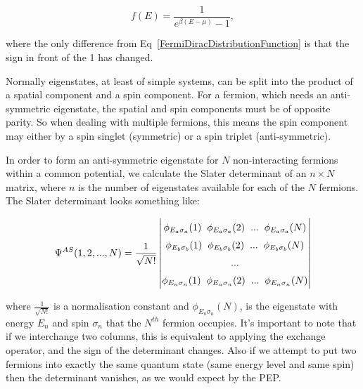 \begin{equation}
    f(E) = \frac{1}{e^{\beta (E - \mu)} - 1},
    \label{BoseEinsteinDistributionFunction}
\end{equation}

\noindent where the only difference from Eq~\ref{FermiDiracDistributionFunction} is that the sign in front of the 1 has changed.

\noindent Normally eigenstates, at least of simple systems, can be split into the product of a spatial component and a spin component. For a fermion, which needs an anti-symmetric eigenstate, the spatial and spin components must be of opposite parity. So when dealing with multiple fermions, this means the spin component may either by a spin singlet (symmetric) or a spin triplet (anti-symmetric).

\noindent In order to form an anti-symmetric eigenstate for $N$ non-interacting fermions within a common potential, we calculate the Slater determinant of an $n \times N$ matrix, where $n$ is the number of eigenstates available for each of the $N$ fermions. The Slater determinant looks something like:

\begin{equation}
    \renewcommand*{\arraystretch}{1.5}
    \setlength\arraycolsep{20pt}
    \Psi^{AS} (1, 2, ..., N) = \frac{1}{\sqrt{N!}} \begin{vmatrix} \phi_{E_a\sigma_a} (1) \hspace{2mm} \phi_{E_a\sigma_a} (2) \hspace{2mm} ... \hspace{2mm} \phi_{E_a\sigma_a} (N) \\ \phi_{E_b\sigma_b} (1) \hspace{2mm} \phi_{E_b\sigma_b} (2) \hspace{2mm} ... \hspace{2mm} \phi_{E_b\sigma_b} (N) \\ ... \\ \phi_{E_n\sigma_n} (1) \hspace{2mm} \phi_{E_n\sigma_n} (2) \hspace{2mm} ... \hspace{2mm} \phi_{E_n\sigma_n} (N)      \end{vmatrix}
    \label{SlaterDeterminant}
\end{equation}

\noindent where $\frac{1}{\sqrt{N!}}$ is a normalisation constant and $\phi_{E_n\sigma_n} (N)$, is the eigenstate with energy $E_n$ and spin $\sigma_n$ that the $N^{th}$ fermion occupies. It's important to note that if we interchange two columns, this is equivalent to applying the exchange operator, and the sign of the determinant changes. Also if we attempt to put two fermions into exactly the same quantum state (same energy level and same spin) then the determinant vanishes, as we would expect by the PEP.

